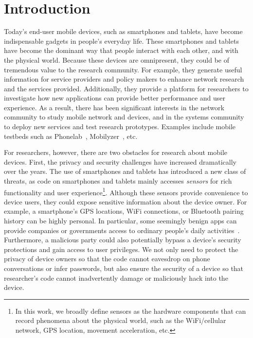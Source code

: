 \section{Introduction}

Today's end-user mobile devices, such as smartphones and
tablets, have become indispensable gadgets in people's everyday
life. These smartphones and tablets have become the dominant way that 
people interact with each other, and with the physical world. Because 
these devices are omnipresent, they could be of tremendous value to 
the research community. For example, they 
generate useful information for service providers and policy
makers to enhance network research and the services provided.
Additionally, they provide a platform for researchers to
investigate how new applications can provide better performance
and user experience.
As a result, there has been significant interests in the network
community to study mobile network and devices, and in the
systems community to deploy new services and test research
prototypes. Examples include mobile testbeds such as 
Phonelab~\cite{phonelab, nandugudi2013phonelab}, 
Mobilyzer~\cite{nikravesh2015mobilyzer}, etc.
					
For researchers, however, there are two obstacles for research
about mobile devices. First, the privacy and security challenges
have increased dramatically over the years. The use of 
smartphones and tablets has introduced a new class of threats, 
as code on smartphones and tablets mainly accesses
\textit{sensors} for rich functionality and user experience\footnote{In 
this work, we broadly define sensors as the hardware components 
that can record phenomena about the physical world, such as the 
WiFi/cellular network, GPS location, movement acceleration, etc.}. 
Although these sensors provide convenience to device users, they 
could expose sensitive information about the device 
owner. For example, a smartphone's GPS locations,
WiFi connections, or Bluetooth pairing history can be highly
personal. In particular, some seemingly benign apps can provide 
companies or governments access to ordinary 
people's daily activities~\cite{AngryBirds}. Furthermore, 
a malicious party could also potentially bypass a
device's security protections and gain access to user
privileges. We not only need to  protect the privacy
of device owners so that the code cannot eavesdrop on phone
conversations or infer passwords, but also ensure the security of a device
so that researcher's code cannot inadvertently damage or
maliciously hack into the device.

